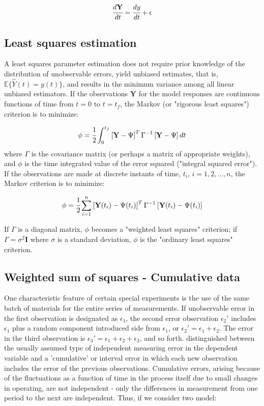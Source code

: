 \documentclass[a4paper,fleqn]{cas-dc}
\begin{document}
{\footnotesize
\begin{equation}
	\cfrac{d\textbf{Y}}{dt} = \cfrac{dy}{dt} + \epsilon
\end{equation} }

\subsection{Least squares estimation}
A least squares parameter estimation does not require prior knowledge of the distribution of unobservable errors, yield  unbiased estimates, that is, $ \mathbb{E}\{\hat{Y}(t) = y(t) \} $, and results in the minimum variance among all linear unbiased estimators. If the observations $\textbf{Y}$ for the model responses are continuous functions of time from $t = 0$ to $t = t_f$, the Markov (or "rigorous least squares") criterion is to minimize:

{\footnotesize
\begin{equation}
	\phi =  \cfrac{1}{2} \int_{0}^{t_f}  \left[ \textbf{Y} - \Psi \right]^T \Gamma^{-1} \left[ \textbf{Y} - \Psi \right] dt
\end{equation} }
where $\Gamma$ is the covariance matrix (or perhaps a matrix of appropriate weights), and $\phi$ is the time integrated value of the error squared ("integral squared error"). If the observations are made at discrete instants of time, $t_i$, $i = 1,2,...,n$, the Markov criterion is to minimize:

{\footnotesize
\begin{equation}
	\phi = \cfrac{1}{2} \sum_{i=1}^{n} \left[ \textbf{Y}(t_i) - \Psi(t_i) \right]^T \Gamma^{-1} \left[ \textbf{Y}(t_i) - \Psi(t_i) \right] 
\end{equation} }

If $\Gamma$ is a diagonal matrix, $\phi$  becomes a "weighted least squares" criterion; if $\Gamma = \sigma^2 \textbf{I}$ where $\sigma$ is a standard deviation, $\phi$ is the "ordinary least squares" criterion.

\subsection{Weighted sum of squares - Cumulative data}

One characteristic feature of certain special experiments is the use of the same batch of materials for the entire series of measurements. If unobservable error in the first observation is designated as $\epsilon_1$, the second error observation $\epsilon_2'$ includes $\epsilon_1$ plus a random component introduced side from $\epsilon_1$, or $\epsilon_2' = \epsilon_1 + \epsilon_2$. The error in the third observation is $\epsilon_3' = \epsilon_1 + \epsilon_2 + \epsilon_3$, and so forth. \citet{Mandel1957} distinguished between the usually assumed type of independent measuring error in the dependent variable and a 'cumulative' or interval error in which each new observation includes the error of the previous observations. Cumulative errors, arising because of the fluctuations as a function of time in the process itself due to small changes in operating, are not independent - only the differences in measurement from one period to the next are independent. Thus, if we consider two model:
\end{document}
